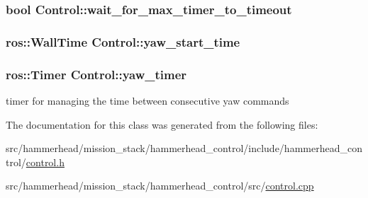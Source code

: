 \subsubsection[{\texorpdfstring{wait\+\_\+for\+\_\+max\+\_\+timer\+\_\+to\+\_\+timeout}{wait_for_max_timer_to_timeout}}]{\setlength{\rightskip}{0pt plus 5cm}bool Control\+::wait\+\_\+for\+\_\+max\+\_\+timer\+\_\+to\+\_\+timeout\hspace{0.3cm}{\ttfamily [private]}}\hypertarget{classControl_a91aff903721b3e11bc7e4ea1d621dfbf}{}\label{classControl_a91aff903721b3e11bc7e4ea1d621dfbf}
\subsubsection[{\texorpdfstring{yaw\+\_\+start\+\_\+time}{yaw_start_time}}]{\setlength{\rightskip}{0pt plus 5cm}ros\+::\+Wall\+Time Control\+::yaw\+\_\+start\+\_\+time\hspace{0.3cm}{\ttfamily [private]}}\hypertarget{classControl_a6934796a534d791ffea03448b383957b}{}\label{classControl_a6934796a534d791ffea03448b383957b}
\subsubsection[{\texorpdfstring{yaw\+\_\+timer}{yaw_timer}}]{\setlength{\rightskip}{0pt plus 5cm}ros\+::\+Timer Control\+::yaw\+\_\+timer\hspace{0.3cm}{\ttfamily [private]}}\hypertarget{classControl_a774bb8a7f0b6355dd487eac011fc54e2}{}\label{classControl_a774bb8a7f0b6355dd487eac011fc54e2}


timer for managing the time between consecutive yaw commands 



The documentation for this class was generated from the following files\+:\begin{DoxyCompactItemize}
\item 
src/hammerhead/mission\+\_\+stack/hammerhead\+\_\+control/include/hammerhead\+\_\+control/\hyperlink{control_8h}{control.\+h}\item 
src/hammerhead/mission\+\_\+stack/hammerhead\+\_\+control/src/\hyperlink{control_8cpp}{control.\+cpp}\end{DoxyCompactItemize}
